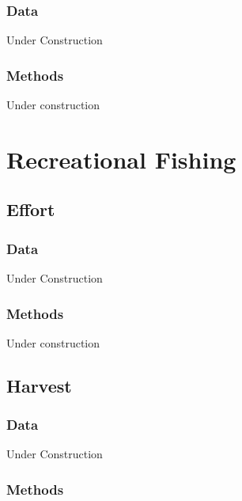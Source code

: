 \documentclass[
]{book}
\begin{document}
\hypertarget{data-16}{%
\subsection{Data}\label{data-16}}

Under Construction

\hypertarget{methods-16}{%
\subsection{Methods}\label{methods-16}}

Under construction

\hypertarget{recreational-fishing}{%
\chapter{Recreational Fishing}\label{recreational-fishing}}

\hypertarget{effort}{%
\section{Effort}\label{effort}}

\hypertarget{data-17}{%
\subsection{Data}\label{data-17}}

Under Construction

\hypertarget{methods-17}{%
\subsection{Methods}\label{methods-17}}

Under construction

\hypertarget{harvest}{%
\section{Harvest}\label{harvest}}

\hypertarget{data-18}{%
\subsection{Data}\label{data-18}}

Under Construction

\hypertarget{methods-18}{%
\subsection{Methods}\label{methods-18}}
\end{document}
